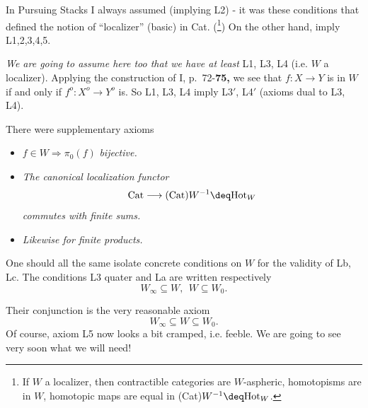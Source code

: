 \noindent In Pursuing Stacks I always assumed  (implying L2) - it was these conditions that defined the notion of ``localizer'' (basic) in Cat. (\footnote[4]{If $W$ a localizer, then contractible categories are $W$-aspheric, homotopisms are in $W$, homotopic maps are equal in (Cat)$W^{-1} \deq \mathrm{Hot}_W$.}) On the other hand,  imply L1,2,3,4,5.

\noindent\textit{We are going to assume here too that we have at least} L1, L3, L4 (i.e. $W$ a localizer). Applying the construction of I, p.~72-\textbf{75,} we see that $f : X \longrightarrow Y$ is in $W$ if and only if $f^o : X^o \longrightarrow Y^o$ is. So L1, L3, L4 imply L3$'$, L4$'$ (axioms dual to L3, L4).

\noindent There were supplementary axioms

\begin{itemize}[leftmargin=2.5em]
\item[\textbf{La}] $f \in W \Longrightarrow \pi_0(f)$ \textit{bijective.}

\item[\textbf{Lb}] \textit{The canonical localization functor}
\[
\mathrm{Cat} \longrightarrow (\mathrm{Cat})W^{-1} \deq \mathrm{Hot}_W
\]
\textit{commutes with finite sums.}

\item[\textbf{Lc}] \textit{Likewise for finite products.}
\end{itemize}

\clearpage

\noindent{}
One should all the same isolate concrete conditions on $W$ for the validity of Lb, Lc. The conditions L3 quater and La are written respectively
\[
W_\infty \subseteq W,\ \ W \subseteq W_0.
\]

\noindent{}

\noindent Their conjunction is the very reasonable axiom
\[
W_\infty \subseteq W \subseteq W_0.
\]
Of course, axiom L5 now looks a bit cramped, i.e. feeble. We are going to see very soon what we will need!

